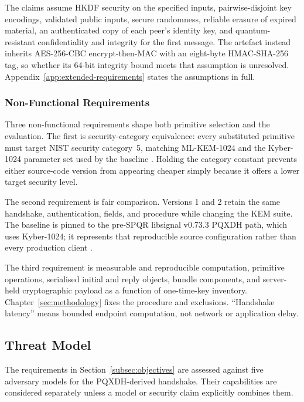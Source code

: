The claims assume HKDF security on the specified inputs, pairwise-disjoint key encodings, validated public inputs, secure randomness, reliable erasure of expired material, an authenticated copy of each peer's identity key, and quantum-resistant confidentiality and integrity for the first message. The artefact instead inherits AES-256-CBC encrypt-then-MAC with an eight-byte HMAC-SHA-256 tag, so whether its 64-bit integrity bound meets that assumption is unresolved. Appendix~\ref{app:extended-requirements} states the assumptions in full.

\subsubsection{Non-Functional Requirements}
\label{subsubsec:req-nonfunctional}

Three non-functional requirements shape both primitive selection and the evaluation. The first is security-category equivalence: every substituted primitive must target NIST security category~5, matching ML-KEM-1024 and the Kyber-1024 parameter set used by the baseline \cite{national_institute_of_standards_and_technology_us_module-lattice-based_2024-1,alagic_status_2022}. Holding the category constant prevents either source-code version from appearing cheaper simply because it offers a lower target security level.

The second requirement is fair comparison. Versions 1 and 2 retain the same handshake, authentication, fields, and procedure while changing the KEM suite. The baseline is pinned to the pre-SPQR libsignal v0.73.3 PQXDH path, which uses Kyber-1024; it represents that reproducible source configuration rather than every production client \cite{kret_pqxdh_nodate,noauthor_release_nodate}.

The third requirement is measurable and reproducible computation, primitive operations, serialised initial and reply objects, bundle components, and server-held cryptographic payload as a function of one-time-key inventory. Chapter~\ref{sec:methodology} fixes the procedure and exclusions. ``Handshake latency'' means bounded endpoint computation, not network or application delay.

\subsection{Threat Model}
\label{subsec:threat-model}

The requirements in Section~\ref{subsec:objectives} are assessed against five adversary models for the PQXDH-derived handshake. Their capabilities are considered separately unless a model or security claim explicitly combines them.

